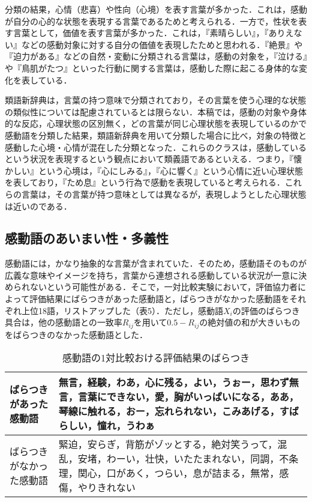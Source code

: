 \documentclass[japanese]{jnlp_1.3c}
\begin{document}
分類の結果，心情（悲喜）や性向（心境）を表す言葉が多かった．これは，感動が自分の心的な状態を表現する言葉であるためと考えられる．一方で，性状を表す言葉として，価値を表す言葉が多かった．これは，『素晴らしい』，『ありえない』などの感動対象に対する自分の価値を表現したためと思われる．『絶景』や『迫力がある』などの自然・変動に分類される言葉は，感動の対象を，『泣ける』や『鳥肌がたつ』といった行動に関する言葉は，感動した際に起こる身体的な変化を表している．


類語新辞典は，言葉の持つ意味で分類されており，その言葉を使う心理的な状態の類似性については配慮されているとは限らない．本稿では，感動の対象や身体的な反応，心理状態の区別無く，どの言葉が同じ心理状態を表現しているのかで感動語を分類した結果，類語新辞典を用いて分類した場合に比べ，対象の特徴と感動した心境・心情が混在した分類となった．これらのクラスは，感動しているという状況を表現するという観点において類義語であるといえる．つまり，『懐かしい』という心境は，『心にしみる』，『心に響く』という心情に近い心理状態を表しており，『ため息』という行為で感動を表現していると考えられる．これらの言葉は，その言葉が持つ意味としては異なるが，表現しようとした心理状態は近いのである．



\subsection{感動語のあいまい性・多義性}

感動語には，かなり抽象的な言葉が含まれていた．そのため，感動語そのものが広義な意味やイメージを持ち，言葉から連想される感動している状況が一意に決められないという可能性がある．そこで，一対比較実験において，評価協力者によって評価結果にばらつきがあった感動語と，ばらつきがなかった感動語をそれぞれ上位18語，リストアップした（表5）．ただし，感動語$X_{i}$の評価のばらつき具合は，他の感動語との一致率$R_{ij}$を用いて$0.5-R_{ij}$の絶対値の和が大きいものをばらつきのなかった感動語とした．



\begin{table}[tb]
\begin{center}
\caption{感動語の1対比較おける評価結果のばらつき}
\begin{tabular*}{140mm}{|p{42mm}|p{91mm}|}        \hline
ばらつきがあった感動語 & 無言，経験，わあ，心に残る，よい，うぉー，思わず無言，言葉にできない，愛，胸がいっぱいになる，ああ，琴線に触れる，おー，忘れられない，こみあげる，すばらしい，憧れ，うわぁ         \\ \hline
ばらつきがなかった感動語 & 緊迫，安らぎ，背筋がゾッとする，絶対笑うって，混乱，安堵，わーい，壮快，いたたまれない，同調，不条理，関心，口があく，つらい，息が詰まる，無常，感傷，やりきれない               \\ \hline
\end{tabular*}                    
\end{center}
\end{table}
\end{document}
